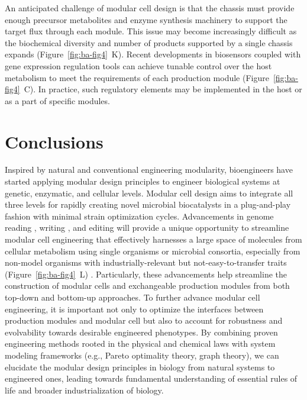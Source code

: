 An anticipated challenge of modular cell design is that the chassis must provide enough precursor metabolites and enzyme synthesis machinery to support the target flux through each module.
This issue may become increasingly difficult as the biochemical diversity and number of products supported by a single chassis expands (Figure~\ref{fig:ba-fig4}~K).
Recent developments in biosensors coupled with gene expression regulation tools \citep{liu2015, meyer2018, moser2018, yang2018, zhang2012} can achieve tunable control over the host metabolism to meet the requirements of each production module (Figure~\ref{fig:ba-fig4}~C).
In practice, such regulatory elements may be implemented in the host or as a part of specific modules.

\section{Conclusions}

Inspired by natural and conventional engineering modularity, bioengineers have started applying modular design principles to engineer biological systems at genetic, enzymatic, and cellular levels.
Modular cell design aims to integrate all three levels for rapidly creating novel microbial biocatalysts in a plug-and-play fashion with minimal strain optimization cycles.
Advancements in genome reading \citep{goodwin2016}, writing \citep{casini2015, kosuri2014}, and editing \citep{barrangou2016} will provide a unique opportunity to streamline modular cell engineering that effectively harnesses a large space of molecules from cellular metabolism using single organisms or microbial consortia, especially from non-model organisms with industrially-relevant but not-easy-to-transfer traits (Figure~\ref{fig:ba-fig4}~L) \citep{abdel-mawgoud2018, carroll2018, kalyuzhnaya2015, lynd2016, thompson2016}.
Particularly, these advancements help streamline the construction of modular cells and exchangeable production modules from both top-down and bottom-up approaches.
To further advance modular cell engineering, it is important not only to optimize the interfaces between production modules and modular cell but also to account for robustness and evolvability towards desirable engineered phenotypes.
By combining proven engineering methods rooted in the physical and chemical laws with system modeling frameworks (e.g., Pareto optimality theory, graph theory), we can elucidate the modular design principles in biology from natural systems to engineered ones, leading towards fundamental understanding of essential rules of life and broader industrialization of biology.

